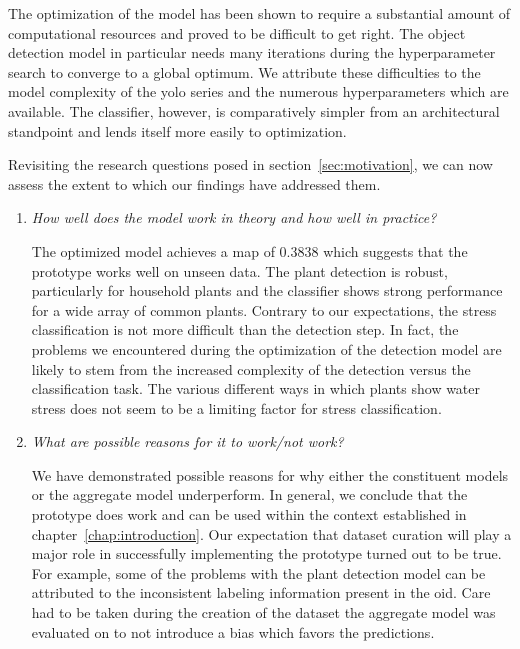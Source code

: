 \documentclass[final]{vutinfth} %
\begin{document}
The optimization of the model has been shown to require a substantial
amount of computational resources and proved to be difficult to get
right. The object detection model in particular needs many iterations
during the hyperparameter search to converge to a global optimum. We
attribute these difficulties to the model complexity of the \gls{yolo}
series and the numerous hyperparameters which are available. The
classifier, however, is comparatively simpler from an architectural
standpoint and lends itself more easily to optimization. 

Revisiting the research questions posed in
section~\ref{sec:motivation}, we can now assess the extent to which
our findings have addressed them.

\begin{enumerate}
\item \emph{How well does the model work in theory and how well in
    practice?}

  The optimized model achieves a \gls{map} of \num{0.3838} which
  suggests that the prototype works well on unseen data. The plant
  detection is robust, particularly for household plants and the
  classifier shows strong performance for a wide array of common
  plants. Contrary to our expectations, the stress classification is
  not more difficult than the detection step. In fact, the problems we
  encountered during the optimization of the detection model are
  likely to stem from the increased complexity of the detection versus
  the classification task. The various different ways in which plants
  show water stress does not seem to be a limiting factor for stress
  classification.

\item \emph{What are possible reasons for it to work/not work?}

  We have demonstrated possible reasons for why either the constituent
  models or the aggregate model underperform. In general, we conclude
  that the prototype does work and can be used within the context
  established in chapter~\ref{chap:introduction}. Our expectation that
  dataset curation will play a major role in successfully implementing
  the prototype turned out to be true. For example, some of the
  problems with the plant detection model can be attributed to the
  inconsistent labeling information present in the \gls{oid}. Care had
  to be taken during the creation of the dataset the aggregate model
  was evaluated on to not introduce a bias which favors the
  predictions.


\end{enumerate}
\end{document}
